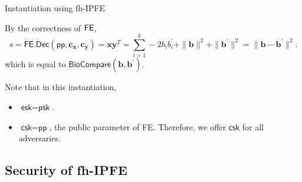 \begin{frame}{Instantiation using fh-IPFE \cite{cryptoeprint:2023/481}}

By the correctness of $\sf FE$,
\[
	s = \textsf{FE.Dec}(\textsf{pp}, \mathbf{c_x}, \mathbf{c_y}) =  \mathbf{x} \mathbf{y}^T = \sum_{i=1}^k -2b_ib_i^\prime + \|\mathbf{b}\|^2 + \|\mathbf{b}^\prime\|^2 = \| \mathbf{b} - \mathbf{b}^\prime \|^2.
\]
which is equal to $\textsf{BioCompare}(\mathbf{b}, \mathbf{b}^\prime)$.
\pause

Note that in this instantiation,
\pause

\begin{itemize}
	\item $\textsf{esk} = \textsf{psk}$.
	\pause

	\item $\textsf{csk} = \textsf{pp}$, the public parameter of \textsf{FE}. Therefore, we offer $\textsf{csk}$ for all adversaries.

\end{itemize}


\end{frame}


\subsection{Security of fh-IPFE}


